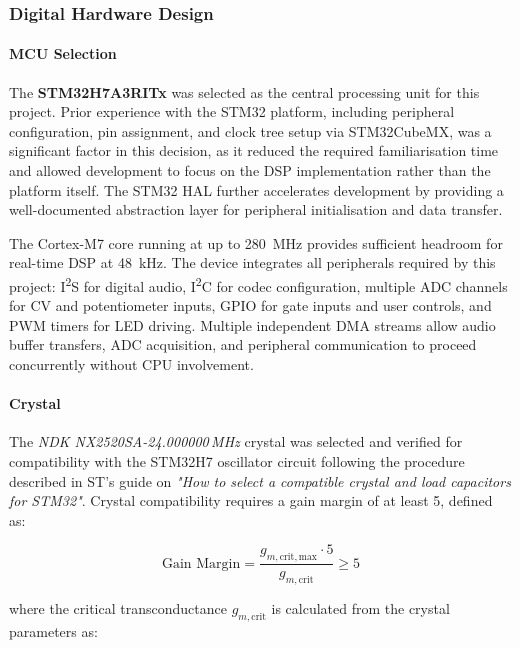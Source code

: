 \subsubsection{Digital Hardware Design}
\paragraph{MCU Selection}
The \textbf{STM32H7A3RITx} was selected as the central processing unit for this project. 
Prior experience with the STM32 platform, including peripheral configuration, pin assignment, and clock tree setup via STM32CubeMX, was a significant factor in this decision, as it reduced the required familiarisation time and allowed development to focus on the DSP implementation rather than the platform itself. 
The STM32 \ac{HAL} further accelerates development by providing a well-documented abstraction layer for peripheral initialisation and data transfer.

The Cortex-M7 core running at up to \qty{280}{\mega\hertz} provides sufficient headroom for real-time DSP at \qty{48}{\kilo\hertz}.  
The device integrates all peripherals required by this project: 
I\textsuperscript{2}S for digital audio, I\textsuperscript{2}C for codec configuration, multiple ADC channels for CV and potentiometer inputs, GPIO for gate inputs and user controls, and PWM timers for LED driving. 
Multiple independent DMA streams allow audio buffer transfers, ADC acquisition, and peripheral communication to proceed concurrently without CPU involvement\cite{stmicroelectronicsStm32h7a3riDatasheet}.

\paragraph{Crystal}

The \textit{NDK NX2520SA-24.000000\,MHz} \cite{Ndk_08142018_NX2520SA24000000MHzB8} crystal was selected and verified for compatibility with the STM32H7 oscillator circuit following the procedure described in ST's guide on \textit{"How to select a compatible crystal and load capacitors for STM32"}\cite{HowSelectCompatible2025}. 
Crystal compatibility requires a gain margin of at least 5, defined as:

\begin{equation}
\text{Gain Margin} = \frac{g_{m,\mathrm{crit,max}} \cdot 5}{g_{m,\mathrm{crit}}} \geq 5
\end{equation}

where the critical transconductance $g_{m,\mathrm{crit}}$ is calculated from the crystal parameters as:

